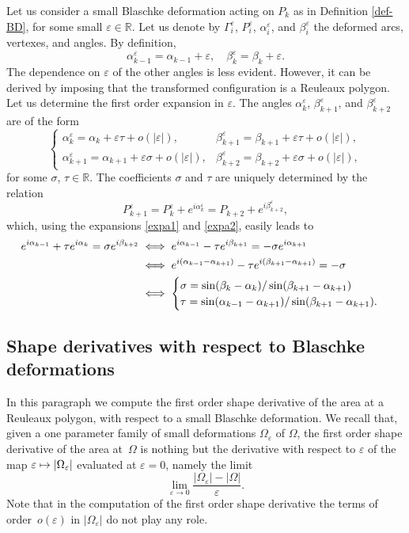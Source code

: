 \documentclass[11pt]{article}
\numberwithin{equation}{section}
\newcommand\mto{\mathchoice{\longmapsto}{\mapsto}{\mapsto}{\mapsto}}
\let\epsilon\varepsilon
\theoremstyle{plain}
\theoremstyle{definition}
\let \e\epsilon
\let\B\Gamma
\begin{document}
Let us consider a small Blaschke deformation acting on $P_k$ as in Definition \ref{def-BD}, for some small $\e\in \mathbb R$. Let us denote by $\B_i^\e$, $P_i^\e$, $\alpha_i^\e$, and $\beta_i^\e$ the deformed arcs, vertexes, and angles. By definition,
\begin{equation}\label{expa1}
\alpha_{k-1}^\e= \alpha_{k-1}+\e,\quad \beta_k^{\e} = \beta_k + \e.
\end{equation}
The dependence on $\e$ of the other angles is less evident. However, it can be derived by imposing that the transformed configuration is a Reuleaux polygon. Let us determine the first order expansion in $\e$. The angles $\alpha_k^\e$, $\beta_{k+1}^\e$, and $\beta_{k+2}^\e$ are of the form
\begin{equation}\label{expa2}
\begin{cases}
\alpha_k^\e = \alpha_k + \e \tau + {o(|\e|)}, & \beta_{k+1}^\e = \beta_{k+1} + \e \tau + o(|\e|),
\\
\alpha_{k+1}^\e = \alpha_{k+1} + \e \sigma + o(|\e|), & \beta_{k+2}^\e = \beta_{k+2} + \e \sigma + o(|\e|),
\end{cases}
\end{equation}
for some $\sigma$, $\tau\in \mathbb R$. The coefficients $\sigma$ and $\tau$ are uniquely determined by the relation
\[
P_{k+1}^\e = P_k^\e + e^{i \alpha_{k}^\e}=P_{k+2} + e^{i \beta_{k+2}^\e},
\]
which, using the expansions \eqref{expa1} and \eqref{expa2}, easily leads to
\begin{align}
e^{i \alpha_{k-1}} + \tau e^{i\alpha_k} = \sigma e^{i\beta_{k+2}}&\iff e^{i \alpha_{k-1}} - \tau e^{i\beta_{k+1}} = - \sigma e^{i\alpha_{k+1}} \notag
\\
& \iff e^{i (\alpha_{k-1} - \alpha_{k+1})} - \tau e^{i(\beta_{k+1} - \alpha_{k+1})}=-\sigma\notag
\\
& \iff
\begin{cases}\label{ab}
\sigma= \sin(\beta_k - \alpha_k) / \sin(\beta_{k+1} - \alpha_{k+1})\\ \tau= \sin(\alpha_{k-1} - \alpha_{k+1}) / \sin(\beta_{k+1} - \alpha_{k+1}).
\end{cases}
\end{align}

\subsection{Shape derivatives with respect to Blaschke deformations}
In this paragraph we compute the first order shape derivative of the area at a Reuleaux polygon, with respect to a small Blaschke deformation. We recall that, given a one parameter family of small deformations $\Omega_\e$ of $\Omega$, the first order shape derivative of the area at~$\Omega$ is nothing but the derivative with respect to $\e$ of the map
$
\e \mto |\Omega_\e|
$
evaluated at $\e=0$, namely the limit
\[
\lim_{\e \to 0} \frac{|\Omega_\e|-|\Omega|}{\e}.
\]
{Note that} in the computation of the first order shape derivative {the terms} of order~$o(\e)$ {in $|\Omega_\e|$} do not play any role.
\end{document}
